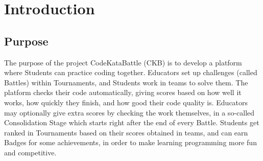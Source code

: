 \documentclass{Configuration_Files/Template}
\begin{document}


\pagestyle{empty} %
\frontmatter %


\startpreamble
\setcounter{page}{1} %


\thispagestyle{empty}
\tableofcontents %
\thispagestyle{empty}
\cleardoublepage


\mainmatter %


\chapter{Introduction}

\section{Purpose}

The purpose of the project CodeKataBattle (CKB) is to develop a platform where Students can practice coding together. Educators set up challenges (called Battles) within Tournaments, and Students work in teams to solve them. The platform checks their code automatically, giving scores based on how well it works, how quickly they finish, and how good their code quality is. Educators may optionally give extra scores by checking the work themselves, in a so-called Consolidation Stage which starts right after the end of every Battle. Students get ranked in Tournaments based on their scores obtained in teams, and can earn Badges for some achievements, in order to make learning programming more fun and competitive.
\end{document}
